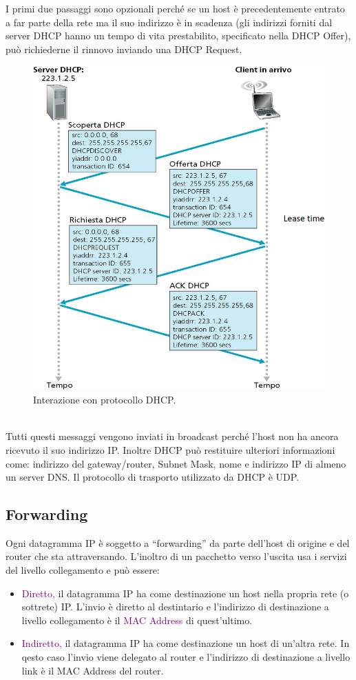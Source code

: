 I primi due passaggi sono opzionali perché se un host è precedentemente entrato a far parte della rete ma il suo indirizzo è in scadenza (gli indirizzi forniti dal server DHCP hanno un tempo di vita prestabilito, specificato nella DHCP Offer), può richiederne il rinnovo inviando una DHCP Request.
\begin{figure}[h]
    \centering
    \includegraphics[scale=0.29]{Immagini/DHCPRequest.png}
    \caption{Interazione con protocollo DHCP.}
\end{figure}
\\Tutti questi messaggi vengono inviati in broadcast perché l'host non ha ancora ricevuto il suo indirizzo IP. 
Inoltre DHCP può restituire ulteriori informazioni come: indirizzo del gateway/router, Subnet Mask, nome e indirizzo IP di almeno un server DNS.
Il protocollo di trasporto utilizzato da DHCP è UDP.

\subsection{Forwarding}
Ogni datagramma IP è soggetto a “forwarding” da parte dell'host di origine e del router che sta attraversando. L'inoltro di un pacchetto verso l’uscita usa i servizi del livello collegamento e può essere: 
\begin{itemize}
    \item \textcolor{purple}{Diretto,} il datagramma IP ha come destinazione un host nella propria rete (o sottrete) IP. L'invio è diretto al destintario e l'indirizzo di destinazione a livello collegamento è il \textcolor{purple}{MAC Address} di quest'ultimo.
    \item \textcolor{purple}{Indiretto,} il datagramma IP ha come destinazione un host di un'altra rete. In qesto caso l'invio viene delegato al router e l'indirizzo di destinazione a livello link è il MAC Address del router.
\end{itemize}

